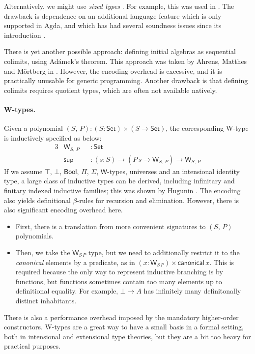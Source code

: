 \documentclass[12pt,a4paper,twoside,openany]{book}
\theoremstyle{remark}
\theoremstyle{definition}
\newcommand{\ms}[1]{\mathsf{#1}}
\newcommand{\Set}{\mathsf{Set}}
\newcommand{\Bool}{\ms{Bool}}
\begin{document}
Alternatively, we might use \emph{sized types} \cite{abel17normalization}. For
example, this was used in \cite{allais20type}. The drawback is dependence on an
additional language feature which is only supported in Agda, and which has had
several soundness issues since its introduction \cite{TODO}.

There is yet another possible approach: defining initial algebras as sequential
colimits, using Adámek's theorem. This approach was taken by Ahrens, Matthes and
Mörtberg in \cite{ahrens19from}. However, the encoding overhead is excessive,
and it is practically unusable for generic programming. Another drawback is that
defining colimits requires quotient types, which are often not available
natively.

\paragraph{W-types.} Given a polynomial $(S,\,P) : (S : \Set) \times (S \to \Set)$,
the corresponding W-type is inductively specified as below:
\begin{alignat*}{3}
  & \ms{W}_{S,\,P} &&: \Set \\
  & \ms{sup} &&: (s : S) \to (P\,s \to \ms{W}_{S,\,P}) \to \ms{W}_{S,\,P}
\end{alignat*}
If we assume $\top$, $\bot$, $\Bool$, $\Pi$, $\Sigma$, $\ms{W}$-types, universes
and an intensional identity type, a large class of inductive types can be
derived, including infinitary and finitary indexed inductive families; this
was shown by Hugunin \cite{whynotw}. The encoding also yields definitional
$\beta$-rules for recursion and elimination. However, there is also significant
encoding overhead here.
\begin{itemize}
  \item
    First, there is a translation from more convenient signatures to $(S,\,P)$ polynomials.
  \item Then, we take the $\ms{W}_{S\,P}$ type, but we need to additionally
    restrict it to the \emph{canonical} elements by a predicate, as in $(x :
    \ms{W}_{S\,P}) \times \ms{canonical}\,x$. This is required because the only
    way to represent inductive branching is by functions, but functions
    sometimes contain too many elements up to definitional equality. For
    example, $\bot \to A$ has infinitely many definitonally distinct
    inhabitants.
\end{itemize}
There is also a performance overhead imposed by the mandatory higher-order
constructors. W-types are a great way to have a small basis in a formal setting,
both in intensional and extensional type theories, but they are a bit too heavy
for practical purposes.
\end{document}
